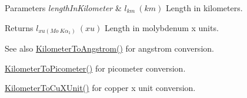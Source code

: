 \begin{DoxyParams}{Parameters}
{\em length\+In\+Kilometer} & $ l_{km}\ (km)$ Length in kilometers. \\
\hline
\end{DoxyParams}
\begin{DoxyReturn}{Returns}
$ l_{xu(Mo\ K\alpha_1)}\ (xu)$ Length in molybdenum x units. 
\end{DoxyReturn}
\begin{DoxySeeAlso}{See also}
\mbox{\hyperlink{group___e_g_x_math-_conversions-_length_conversions-_kilometer-_non-_s_i_ga415a412a1b03916d6071a206a3318035}{Kilometer\+To\+Angstrom()}} for angstrom conversion. 

\mbox{\hyperlink{group___e_g_x_math-_conversions-_length_conversions-_kilometer-_s_i_ga73f6e033de3c41892f06cde1862f68d6}{Kilometer\+To\+Picometer()}} for picometer conversion. 

\mbox{\hyperlink{group___e_g_x_math-_conversions-_length_conversions-_kilometer-_non-_s_i_ga0614eb6a9e8bf1a9ba6cf51121f22083}{Kilometer\+To\+Cu\+X\+Unit()}} for copper x unit conversion. 
\end{DoxySeeAlso}
